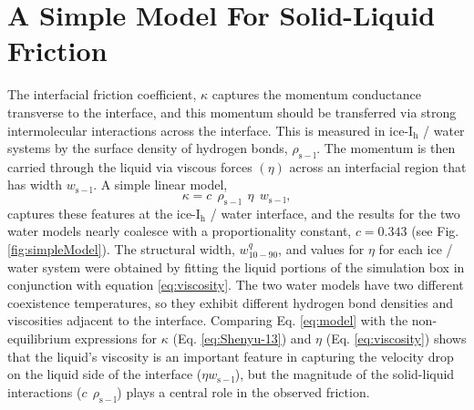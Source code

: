 \section{A Simple Model For Solid-Liquid Friction}
The interfacial friction coefficient, $\kappa$ captures the momentum
conductance transverse to the interface, and this momentum should be
transferred via strong intermolecular interactions across the
interface. This is measured in ice-I$_\mathrm{h}$ / water systems by
the surface density of hydrogen bonds, $\rho_\mathrm{s-l}$.  The
momentum is then carried through the liquid via viscous forces
$(\eta)$ across an interfacial region that has width
$w_\mathrm{s-l}$. A simple linear model,
\begin{equation}
  \kappa = c~~\rho_\mathrm{s-l}~~\eta~~w_\mathrm{s-l},
\label{eq:model}
\end{equation}
captures these features at the ice-I$_\mathrm{h}$ / water interface,
and the results for the two water models nearly coalesce with a
proportionality constant, $c = 0.343$ (see
Fig. \ref{fig:simpleModel}).  The structural width,
$w_\mathrm{10-90}^{q}$, and values for $\eta$ for each ice / water
system were obtained by fitting the liquid portions of the simulation
box in conjunction with equation \eqref{eq:viscosity}.  The two water
models have two different coexistence temperatures, so they exhibit
different hydrogen bond densities and viscosities adjacent to the
interface.  Comparing Eq. \eqref{eq:model} with the non-equilibrium
expressions for $\kappa$ (Eq. \eqref{eq:Shenyu-13}) and $\eta$
(Eq. \eqref{eq:viscosity}) shows that the liquid's viscosity is an
important feature in capturing the velocity drop on the liquid side of
the interface ($\eta w_\mathrm{s-l}$), but the magnitude of the
solid-liquid interactions ($c~~\rho_\mathrm{s-l}$) plays a central
role in the observed friction.

